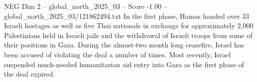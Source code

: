 \begin{textsample}{NEG Dim 2 – global\_north\_2025\_03 – Score -1.00 – global\_north\_2025\_03/121862494.txt}
In the first phase, Hamas handed over 33 Israeli hostages as well as five Thai nationals in exchange for approximately 2,000 Palestinians held in Israeli jails and the withdrawal of Israeli troops from some of their positions in Gaza.
During the almost-two month long ceasefire, Israel has been accused of violating the deal a number of times.
Most recently, Israel suspended much-needed humanitarian aid entry into Gaza as the first phase of the deal expired.

\end{textsample}
